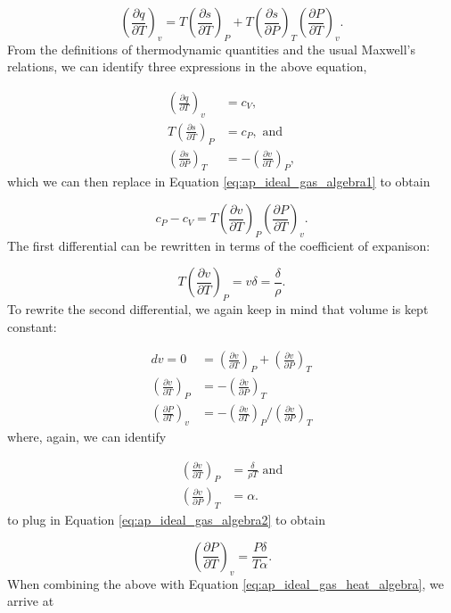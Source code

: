 \documentclass[12pt]{article}
\newcommand{\pderiv}[2]{\frac{\partial #1}{\partial #2}}
\newcommand{\bigparenthesis}[1]{\left(#1\right)}
\begin{document}
\begin{equation}
    \bigparenthesis{\pderiv{q}{T}}_v = T\bigparenthesis{\pderiv{s}{T}}_P + T \bigparenthesis{\pderiv{s}{P}}_T \bigparenthesis{\pderiv{P}{T}}_v. \label{eq:ap_ideal_gas_algebra1}
\end{equation}
%
From the definitions of thermodynamic quantities and the usual Maxwell's relations, we can identify three expressions in the above equation,

\begin{align}
    \bigparenthesis{\pderiv{q}{T}}_v &= c_V, \\
    T \bigparenthesis{\pderiv{s}{T}}_P &= c_P,\text{ and} \\
    \bigparenthesis{\pderiv{s}{P}}_T &= -\bigparenthesis{\pderiv{v}{T}}_P,
\end{align}
%
which we can then replace in Equation \ref{eq:ap_ideal_gas_algebra1} to obtain

\begin{equation}
    c_P - c_V = T\bigparenthesis{\pderiv{v}{T}}_P \bigparenthesis{\pderiv{P}{T}}_v. \label{eq:ap_ideal_gas_heat_algebra}
\end{equation}
%
The first differential can be rewritten in terms of the coefficient of expanison:

\begin{equation}
    T\bigparenthesis{\pderiv{v}{T}}_P = v\delta = \frac{\delta}{\rho}.
\end{equation}
%
To rewrite the second differential, we again keep in mind that volume is kept constant:

\begin{align}
    dv = 0 &= \bigparenthesis{\pderiv{v}{T}}_P + \bigparenthesis{\pderiv{v}{P}}_T \\
    \bigparenthesis{\pderiv{v}{T}}_P &= -\bigparenthesis{\pderiv{v}{P}}_T \\
    \bigparenthesis{\pderiv{P}{T}}_v &= -\bigparenthesis{\pderiv{v}{T}}_P \big/ \bigparenthesis{\pderiv{v}{P}}_T \label{eq:ap_ideal_gas_algebra2}
\end{align}
%
where, again, we can identify 

\begin{align}
    \bigparenthesis{\pderiv{v}{T}}_P &= \frac{\delta}{\rho T}\text{ and} \\
    \bigparenthesis{\pderiv{v}{P}}_T &= \alpha.
\end{align} 
%
to plug in Equation \ref{eq:ap_ideal_gas_algebra2} to obtain

\begin{equation}
    \bigparenthesis{\pderiv{P}{T}}_v = \frac{P\delta}{T\alpha}.
\end{equation}
%
When combining the above with Equation \ref{eq:ap_ideal_gas_heat_algebra}, we arrive at
\end{document}
